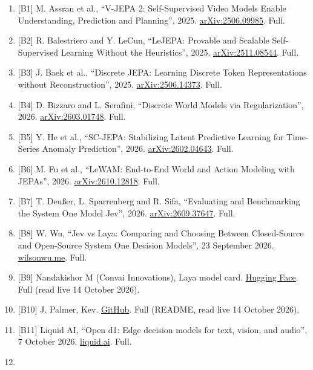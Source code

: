 \documentclass[10pt,letterpaper]{article}
\providecommand{\tightlist}{\setlength{\itemsep}{1pt}\setlength{\parskip}{0pt}}
\begin{document}
\begin{enumerate}
\def\labelenumi{\arabic{enumi}.}
\tightlist
\item
  {[}B1{]} M. Assran et al., ``V-JEPA 2: Self-Supervised Video Models
  Enable Understanding, Prediction and Planning'', 2025.
  \href{https://arxiv.org/abs/2506.09985}{arXiv:2506.09985}. Full.
\item
  {[}B2{]} R. Balestriero and Y. LeCun, ``LeJEPA: Provable and Scalable
  Self-Supervised Learning Without the Heuristics'', 2025.
  \href{https://arxiv.org/abs/2511.08544}{arXiv:2511.08544}. Full.
\item
  {[}B3{]} J. Baek et al., ``Discrete JEPA: Learning Discrete Token
  Representations without Reconstruction'', 2025.
  \href{https://arxiv.org/abs/2506.14373}{arXiv:2506.14373}. Full.
\item
  {[}B4{]} D. Bizzaro and L. Serafini, ``Discrete World Models via
  Regularization'', 2026.
  \href{https://arxiv.org/abs/2603.01748}{arXiv:2603.01748}. Full.
\item
  {[}B5{]} Y. He et al., ``SC-JEPA: Stabilizing Latent Predictive
  Learning for Time-Series Anomaly Prediction'', 2026.
  \href{https://arxiv.org/abs/2602.04643}{arXiv:2602.04643}. Full.
\item
  {[}B6{]} M. Fu et al., ``LeWAM: End-to-End World and Action Modeling
  with JEPAs'', 2026.
  \href{https://arxiv.org/abs/2610.12818}{arXiv:2610.12818}. Full.
\item
  {[}B7{]} T. Deußer, L. Sparrenberg and R. Sifa, ``Evaluating and
  Benchmarking the System One Model Jev'', 2026.
  \href{https://arxiv.org/abs/2609.37647}{arXiv:2609.37647}. Full.
\item
  {[}B8{]} W. Wu, ``Jev vs Laya: Comparing and Choosing Between
  Closed-Source and Open-Source System One Decision Models'', 23
  September 2026.
  \href{https://wilsonwu.me/en/blog/2026/jev-vs-laya/}{wilsonwu.me}.
  Full.
\item
  {[}B9{]} Nandakishor M (Convai Innovations), Laya model card.
  \href{https://huggingface.co/convaiinnovations/laya}{Hugging Face}.
  Full (read live 14 October 2026).
\item
  {[}B10{]} J. Palmer, Kev.
  \href{https://github.com/jaredpalmer/kev}{GitHub}. Full (README, read
  live 14 October 2026).
\item
  {[}B11{]} Liquid AI, ``Open d1: Edge decision models for text, vision,
  and audio'', 7 October 2026.
  \href{https://www.liquid.ai/blog/d1-open}{liquid.ai}. Full.
\item

\end{enumerate}
\end{document}
